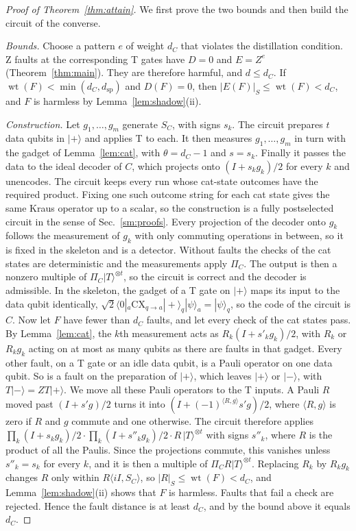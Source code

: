 \documentclass[aps,prl,reprint,twocolumn,amsmath,amssymb,floatfix,nofootinbib,superscriptaddress]{revtex4-2}
\theoremstyle{definition}
\theoremstyle{remark}
\newcommand{\wt}{\operatorname{wt}}
\begin{document}
\begin{proof}[Proof of Theorem~\ref{thm:attain}]
We first prove the two bounds and then build the circuit of the converse.

\emph{Bounds.} Choose a pattern $e$ of weight $d_C$ that violates the distillation condition. Z faults at the corresponding T gates have $D=0$ and $E=Z^e$ (Theorem~\ref{thm:main}). They are therefore harmful, and $d\leq d_C$. If $\wt(F)<\min(d_C,d_{\mathrm{sp}})$ and $D(F)=0$, then $|E(F)|_S\leq\wt(F)<d_C$, and $F$ is harmless by Lemma~\ref{lem:shadow}(ii).

\emph{Construction.} Let $g_1,\dots,g_m$ generate $S_C$, with signs $s_k$. The circuit prepares $t$ data qubits in $|{+}\rangle$ and applies T to each. It then measures $g_1,\dots,g_m$ in turn with the gadget of Lemma~\ref{lem:cat}, with $\theta=d_C-1$ and $s=s_k$. Finally it passes the data to the ideal decoder of $C$, which projects onto $(I+s_kg_k)/2$ for every $k$ and unencodes. The circuit keeps every run whose cat-state outcomes have the required product. Fixing one such outcome string for each cat state gives the same Kraus operator up to a scalar, so the construction is a fully postselected circuit in the sense of Sec.~\ref{sm:proofs}. Every projection of the decoder onto $g_k$ follows the measurement of $g_k$ with only commuting operations in between, so it is fixed in the skeleton and is a detector. Without faults the checks of the cat states are deterministic and the measurements apply $\Pi_C$. The output is then a nonzero multiple of $\Pi_C|T\rangle^{\otimes t}$, so the circuit is correct and the decoder is admissible. In the skeleton, the gadget of a T gate on $|{+}\rangle$ maps its input to the data qubit identically, $\sqrt2\langle0|_a\mathrm{CX}_{q\to a}|{+}\rangle_q|\psi\rangle_a=|\psi\rangle_q$, so the code of the circuit is $C$. Now let $F$ have fewer than $d_C$ faults, and let every check of the cat states pass. By Lemma~\ref{lem:cat}, the $k$th measurement acts as $R_k(I+s'_kg_k)/2$, with $R_k$ or $R_kg_k$ acting on at most as many qubits as there are faults in that gadget. Every other fault, on a T gate or an idle data qubit, is a Pauli operator on one data qubit. So is a fault on the preparation of $|{+}\rangle$, which leaves $|{+}\rangle$ or $|{-}\rangle$, with $T|{-}\rangle=ZT|{+}\rangle$. We move all these Pauli operators to the T inputs. A Pauli $R$ moved past $(I+s'g)/2$ turns it into $(I+(-1)^{\langle R,g\rangle}s'g)/2$, where $\langle R,g\rangle$ is zero if $R$ and $g$ commute and one otherwise. The circuit therefore applies $\prod_k(I+s_kg_k)/2\cdot\prod_k(I+s''_kg_k)/2\cdot R\,|T\rangle^{\otimes t}$ with signs $s''_k$, where $R$ is the product of all the Paulis. Since the projections commute, this vanishes unless $s''_k=s_k$ for every $k$, and it is then a multiple of $\Pi_CR|T\rangle^{\otimes t}$. Replacing $R_k$ by $R_kg_k$ changes $R$ only within $R\langle iI,S_C\rangle$, so $|R|_S\leq\wt(F)<d_C$, and Lemma~\ref{lem:shadow}(ii) shows that $F$ is harmless. Faults that fail a check are rejected. Hence the fault distance is at least $d_C$, and by the bound above it equals $d_C$.
\end{proof}
\end{document}
